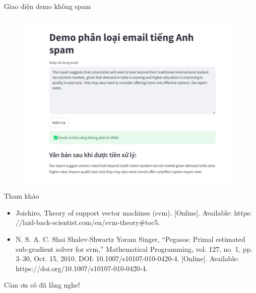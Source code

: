 \documentclass[serif, aspectratio=169]{beamer}
\begin{document}
	\begin{frame}{Giao diện demo không spam}
		\begin{figure}
			\centering
			\includegraphics[width=0.6\linewidth]{pic/demo-not-spam.png}
			\label{fig:demo-not-spam}
		\end{figure}
	\end{frame}
	\begin{frame}{Tham khảo}
		\begin{itemize}
			\item Joichiro, Theory of support vector machines (svm). [Online]. Available: https:
			//laid-back-scientist.com/en/svm-theory#toc5.
			\item N. S. A. C. Shai Shalev-Shwartz Yoram Singer, “Pegasos: Primal estimated
			sub-gradient solver for svm,” Mathematical Programming, vol. 127, no. 1,
			pp. 3–30, Oct. 15, 2010. DOI: 10.1007/s10107-010-0420-4. [Online].
			Available: https://doi.org/10.1007/s10107-010-0420-4.
		\end{itemize}
	\end{frame}
	
	\begin{frame}
		\begin{center}
			{ Cảm ơn cô đã lắng nghe!}
			\vspace{1cm}
			
		\end{center}
	\end{frame}
	
\end{document}
